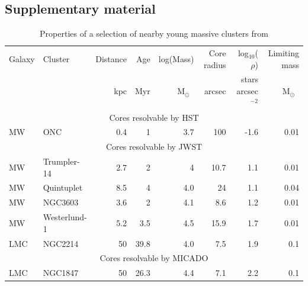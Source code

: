 \documentclass[referee]{aa}
\newcommand{\msun}{M$_\odot$~}
\newcommand{\h}[1]{$^{#1}$}
\begin{document}
\begin{appendix}

\section{Supplementary material}
\label{sec:appendix}

\begin{table}
    \centering
    \caption{Properties of a selection of nearby young massive clusters from \citet{portegies2010}}
    \label{tbl:pz10_selection}
    \begin{tabular}{l l r r r r r r}
        \hline\hline
        Galaxy & Cluster      & Distance & Age  & log(Mass) & Core radius & log$_{10}$($\rho$)    & Limiting mass \\
               &              & kpc      & Myr  & \msun     & arcsec  & stars arcsec\h{-2} & \msun         \\
        \hline
        \multicolumn{8}{c}{Cores resolvable by HST}                                                     \\
        \hline
        MW     & ONC          & 0.4      & 1    & 3.7       & 100     & -1.6           & 0.01          \\
        \hline
        \multicolumn{8}{c}{Cores resolvable by JWST}                                                    \\
        \hline
        MW     & Trumpler-14  & 2.7      & 2    & 4         & 10.7    & 1.1            & 0.01          \\
        MW     & Quintuplet   & 8.5      & 4    & 4.0       & 24      & 1.1            & 0.04          \\
        MW     & NGC3603      & 3.6      & 2    & 4.1       & 8.6     & 1.2            & 0.01          \\
        MW     & Westerlund-1 & 5.2      & 3.5  & 4.5       & 15.9    & 1.7            & 0.01          \\
        LMC    & NGC2214      & 50       & 39.8 & 4.0       & 7.5     & 1.9            & 0.1           \\
        \hline
        \multicolumn{8}{c}{Cores resolvable by MICADO}                                                  \\
        \hline
        LMC    & NGC1847      & 50       & 26.3 & 4.4       & 7.1     & 2.2            & 0.1           \\

\end{tabular}
\end{table}
\end{appendix}
\end{document}
